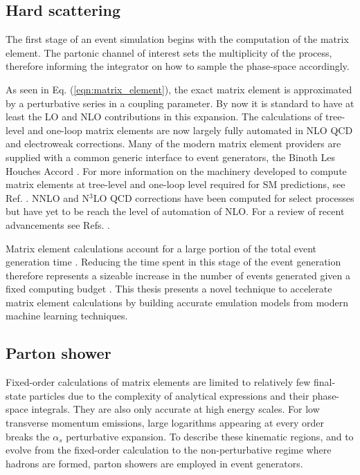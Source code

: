 \documentclass[main.tex]{subfiles}
\begin{document}
    \subsection*{Hard scattering}\label{sec:me_generators}
    The first stage of an event simulation begins with
    the computation of the matrix element. The partonic
    channel of interest sets the multiplicity of the process,
    therefore informing the integrator on how to sample the phase-space
    accordingly.

    As seen in Eq. (\ref{eqn:matrix_element}),
    the exact matrix element is approximated by a perturbative
    series in a coupling parameter. By now it is standard to
    have at least the LO and NLO contributions in this expansion.
    The calculations of
    tree-level \cite{Mangano:2002ea,Krauss:2001iv,Gleisberg:2008fv,Cafarella:2007pc,Alwall:2011uj,Kilian:2007gr}
    and one-loop \cite{Berger:2008sj,Cullen:2011ac,Cullen:2014yla,Bevilacqua:2011xh,Hirschi:2011pa,Alwall:2014hca,Frederix:2018nkq,Campbell:1999ah,Campbell:2021vlt,Badger:2012pg,Cascioli:2011va,Buccioni:2019sur,Actis:2016mpe,Denner:2017wsf}
    matrix elements are now largely fully automated
    in NLO QCD and electroweak corrections.
    Many of the modern matrix element providers are supplied
    with a common generic interface to event generators,
    the Binoth Les Houches Accord \cite{Binoth:2010xt,Alioli:2013nda}.
    For more information on the machinery developed to
    compute matrix elements at tree-level and
    one-loop level required for SM predictions, see Ref. \cite{Campbell:2017hsr}.
    NNLO and N$^{3}$LO QCD corrections have been computed
    for select processes but have yet to be reach the
    level of automation of NLO.
    For a review of recent advancements see Refs. \cite{Caola:2022ayt,Campbell:2022qmc}.
    
    Matrix element calculations account for a large
    portion of the total event generation time \cite{Bothmann:2022thx}.
    Reducing the time spent in this stage of the event
    generation therefore represents a sizeable increase
    in the number of events generated given a fixed computing
    budget \cite{HSFPhysicsEventGeneratorWG:2020gxw}.
    This thesis presents a novel technique to
    accelerate matrix element calculations by building
    accurate emulation models from modern machine learning
    techniques.

    \subsection*{Parton shower}\label{sec:parton_showers}
    Fixed-order calculations of matrix elements are limited
    to relatively few final-state particles due to the complexity
    of analytical expressions and their phase-space integrals.
    They are also only accurate at high energy scales. For low
    transverse momentum emissions, large logarithms appearing at
    every order breaks the $\alpha_{s}$ perturbative expansion.
    To describe these kinematic regions, and to evolve from the fixed-order
    calculation to the non-perturbative regime where hadrons
    are formed, parton showers are employed in event generators.
\end{document}

